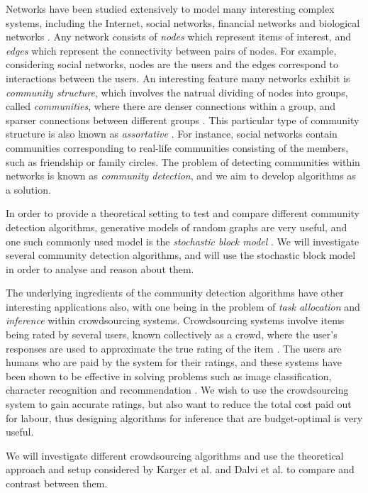 \documentclass[12pt]{article}
\numberwithin{equation}{section}
\begin{document}
Networks have been studied extensively to model many interesting complex systems, including the Internet, social networks, financial networks and biological networks \cite{New06a,DKM+13,MG13}. Any network consists of \textit{nodes} which represent items of interest, and \textit{edges} which represent the connectivity between pairs of nodes. For example, considering social networks, nodes are the users and the edges correspond to interactions between the users. An interesting feature many networks exhibit is \textit{community structure}, which involves the natrual dividing of nodes into groups, called \textit{communities}, where there are denser connections within a group, and sparser connections between different groups \cite{New06a,DKM+13,For10,New06b}. This particular type of community structure is also known as \textit{assortative} \cite{DKM+13}. For instance, social networks contain communities corresponding to real-life communities consisting of the members, such as friendship or family circles. The problem of detecting communities within networks is known as \textit{community detection}, and we aim to develop algorithms as a solution.

In order to provide a theoretical setting to test and compare different community detection algorithms, generative models of random graphs are very useful, and one such commonly used model is the \textit{stochastic block model} \cite{DKM+13,NN12}. We will investigate several community detection algorithms, and will use the stochastic block model in order to analyse and reason about them.

The underlying ingredients of the community detection algorithms have other interesting applications also, with one being in the problem of \textit{task allocation} and \textit{inference} within crowdsourcing systems. Crowdsourcing systems involve items being rated by several users, known collectively as a crowd, where the user's responses are used to approximate the true rating of the item \cite{KOS13,EHR12}. The users are humans who are paid by the system for their ratings, and these systems have been shown to be effective in solving problems such as image classification, character recognition and recommendation \cite{KOS13}. We wish to use the crowdsourcing system to gain accurate ratings, but also want to reduce the total cost paid out for labour, thus designing algorithms for inference that are budget-optimal is very useful.

We will investigate different crowdsourcing algorithms and use the theoretical approach and setup considered by Karger et al.\cite{KOS13} and Dalvi et al. \cite{DDK+13} to compare and contrast between them.
\end{document}
